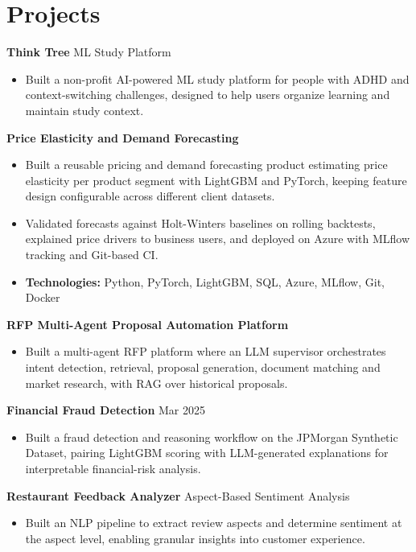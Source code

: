 \documentclass[10pt,a4paper]{article}
\begin{document}
\section{Projects}
\textbf{Think Tree} \textbar{} ML Study Platform\par
\begin{itemize}
  \item Built a non-profit AI-powered ML study platform for people with ADHD and context-switching challenges, designed to help users organize learning and maintain study context.
\end{itemize}
\textbf{Price Elasticity and Demand Forecasting}\par
\begin{itemize}
  \item Built a reusable pricing and demand forecasting product estimating price elasticity per product segment with LightGBM and PyTorch, keeping feature design configurable across different client datasets.
  \item Validated forecasts against Holt-Winters baselines on rolling backtests, explained price drivers to business users, and deployed on Azure with MLflow tracking and Git-based CI.
  \item \textbf{Technologies:} Python, PyTorch, LightGBM, SQL, Azure, MLflow, Git, Docker
\end{itemize}
\textbf{RFP Multi-Agent Proposal Automation Platform}\par
\begin{itemize}
  \item Built a multi-agent RFP platform where an LLM supervisor orchestrates intent detection, retrieval, proposal generation, document matching and market research, with RAG over historical proposals.
\end{itemize}
\textbf{Financial Fraud Detection} \textbar{} Mar 2025\par
\begin{itemize}
  \item Built a fraud detection and reasoning workflow on the JPMorgan Synthetic Dataset, pairing LightGBM scoring with LLM-generated explanations for interpretable financial-risk analysis.
\end{itemize}
\textbf{Restaurant Feedback Analyzer} \textbar{} Aspect-Based Sentiment Analysis\par
\begin{itemize}
  \item Built an NLP pipeline to extract review aspects and determine sentiment at the aspect level, enabling granular insights into customer experience.
\end{itemize}
\end{document}
